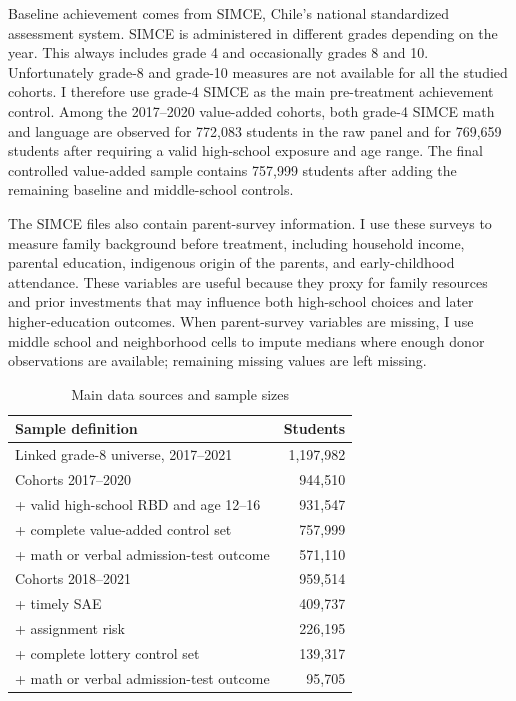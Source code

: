 \documentclass[a4paper, article, english, oneside, unknownkeysallowed, 12pt]{memoir}
\begin{document}
Baseline achievement comes from SIMCE, Chile's national standardized assessment system.
SIMCE is administered in different grades depending on the year. 
This always includes grade 4 and occasionally grades 8 and 10.
Unfortunately grade-8 and grade-10 measures are not available for all the studied cohorts.
I therefore use grade-4 SIMCE as the main pre-treatment achievement control.
Among the 2017--2020 value-added cohorts, both grade-4 SIMCE math and language are observed for 772,083 students in the raw panel and for 769,659 students after requiring a valid high-school exposure and age range.
The final controlled value-added sample contains 757,999 students after adding the remaining baseline and middle-school controls.

The SIMCE files also contain parent-survey information.
I use these surveys to measure family background before treatment, including household income, parental education, indigenous origin of the parents, and early-childhood attendance.
These variables are useful because they proxy for family resources and prior investments that may influence both high-school choices and later higher-education outcomes.
When parent-survey variables are missing, I use middle school and neighborhood cells to impute medians where enough donor observations are available; remaining missing values are left missing.

\begin{table}[H]
\centering
\caption{Main data sources and sample sizes}
\label{tab:data-samples}
\begin{tabular}{lr}
\toprule
Sample definition & Students \\
\midrule
Linked grade-8 universe, 2017--2021 & 1,197,982 \\
\midrule 
Cohorts 2017--2020 & 944,510 \\
+ valid high-school RBD and age 12--16 & 931,547 \\
+ complete value-added control set & 757,999 \\
+ math or verbal admission-test outcome & 571,110 \\
\midrule
Cohorts 2018--2021 & 959,514 \\
+ timely SAE & 409,737 \\
+ assignment risk & 226,195 \\
+ complete lottery control set & 139,317 \\
+ math or verbal admission-test outcome & 95,705 \\
\bottomrule
\end{tabular}
\end{table}
\end{document}
